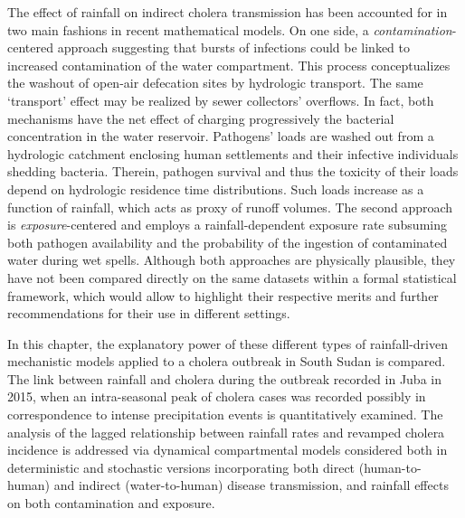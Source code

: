 The effect of rainfall on indirect cholera transmission has been accounted for in two main fashions in recent mathematical models. On one side, a \textit{contamination}-centered approach suggesting that bursts of infections could be linked to increased contamination of the water compartment. This process conceptualizes the washout of open-air defecation sites by hydrologic transport. The same `transport' effect may be realized by sewer collectors' overflows. In fact, both mechanisms have the net effect of charging progressively the bacterial concentration in the water reservoir. Pathogens' loads are washed out from a hydrologic catchment enclosing human settlements and their infective individuals shedding bacteria. Therein, pathogen survival and thus the toxicity of their loads depend on hydrologic residence time distributions. Such loads increase as a function of rainfall, which acts as proxy of runoff volumes. The second approach is \textit{exposure}-centered and employs a rainfall-dependent exposure rate subsuming both pathogen availability and the probability of the ingestion of contaminated water during wet spells. Although both approaches are physically plausible, they have not been compared directly on the same datasets within a formal statistical framework, which would allow to highlight their respective merits and further recommendations for their use in different settings.

In this chapter, the explanatory power of these different types of rainfall-driven mechanistic models applied to a cholera outbreak in South Sudan is compared. The link between rainfall and cholera during the outbreak recorded in Juba in 2015, when an intra-seasonal peak of cholera cases was recorded possibly in correspondence to intense precipitation events is quantitatively examined. The analysis of the lagged relationship between rainfall rates and revamped cholera incidence is addressed via dynamical compartmental models considered both in deterministic and stochastic versions incorporating both direct (human-to-human) and indirect (water-to-human) disease transmission, and rainfall effects on both contamination and exposure.
